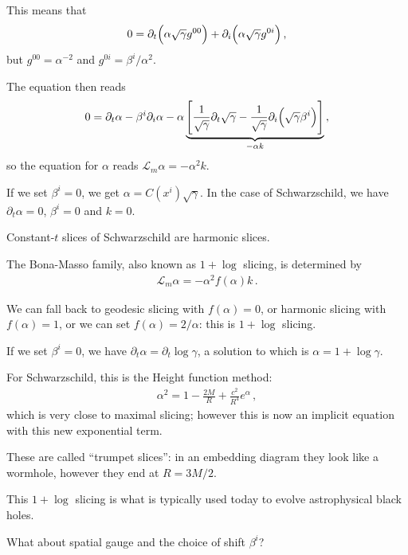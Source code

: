 \documentclass[main.tex]{subfiles}
\begin{document}
This means that 
%
\begin{align}
0 = \partial_{t} \qty(\alpha \sqrt{\gamma } g^{00}) + \partial_{i} \qty(\alpha \sqrt{\gamma } g^{0i})
\,,
\end{align}
%
but \(g^{00} = \alpha^{-2}\) and \(g^{0i}= \beta^{i} / \alpha^2 \). 

The equation then reads 
%
\begin{align}
0 = \partial_{t} \alpha - \beta^{i} \partial_{i} \alpha  - \alpha 
\underbrace{\qty[ \frac{1}{\sqrt{\gamma }} \partial_{t} \sqrt{\gamma } - \frac{1}{\sqrt{\gamma }} \partial_{i} \qty(\sqrt{\gamma } \beta^{i})]}_{- \alpha k}
\,,
\end{align}
%
so the equation for \(\alpha \) reads \(\mathscr{L}_m \alpha = - \alpha^2 k\).

If we set \(\beta^{i} = 0\), we get \(\alpha = C(x^{i}) \sqrt{\gamma }\).
In the case of Schwarzschild, we have \(\partial_{t} \alpha = 0\), \(\beta^{i} = 0\) and \(k = 0\). 

Constant-\(t\) slices of Schwarzschild are harmonic slices. 

The Bona-Masso family, also known as \(1 + \log\) slicing, is determined by 
%
\begin{align}
\mathscr{L}_m \alpha = - \alpha^2 f(\alpha ) k
\,.
\end{align}

We can fall back to geodesic slicing with \(f(\alpha ) = 0\), or harmonic slicing with \(f(\alpha ) = 1\), or we can set \(f(\alpha )= 2/\alpha \): this is \(1+ \log\) slicing. 

If we set \(\beta^{i} = 0\), we have \(\partial_{t} \alpha = \partial_{t}  \log \gamma \), a solution to which is  \(\alpha = 1 + \log \gamma \).

For Schwarzschild, this is the Height function method: 
%
\begin{align}
\alpha^2 = 1 - \frac{2M}{R} + \frac{c^2}{R^{4} } e^{\alpha }
\,,
\end{align}
%
which is very close to maximal slicing; however this is now an implicit equation with this new exponential term. 

These are called ``trumpet slices'': in an embedding diagram they look like a wormhole, however they end at \(R = 3M/2\). 

This \(1 + \log\) slicing is what is typically used today to evolve astrophysical black holes. 

What about spatial gauge and the choice of shift \(\beta^{i}\)? 
\end{document}
